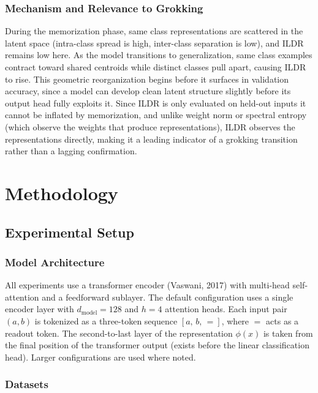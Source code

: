 \documentclass{article}
\begin{document}
\subsubsection{Mechanism and Relevance to Grokking}

During the memorization phase, same class representations are scattered in the 
latent space (intra-class spread is high, inter-class separation is low), and ILDR remains low here. As the model transitions to generalization, 
same class examples contract toward shared centroids while distinct classes pull apart, causing ILDR to rise. This geometric reorganization begins before it surfaces in validation accuracy, since a model can develop clean latent structure slightly before its output head fully exploits it. Since ILDR is only evaluated on held-out inputs it cannot be inflated by memorization, and unlike weight norm or spectral entropy (which observe the weights that produce representations), ILDR observes the representations directly, making it a leading indicator of a grokking transition rather than a lagging confirmation. 

\section{Methodology}

\subsection{Experimental Setup}

\subsubsection{Model Architecture}
All experiments use a transformer encoder (Vaswani, 2017) with multi-head self-attention and a feedforward sublayer.
The default configuration uses a single encoder layer with
$d_{\mathrm{model}} = 128$ and $h = 4$ attention heads.
Each input pair $(a, b)$ is tokenized as a three-token sequence
$[a,\, b,\, {=}]$, where $=$ acts as a readout token. The second-to-last layer of the representation $\phi(x)$ is taken from the final
position of the transformer output (exists before the linear classification head). Larger configurations are used where noted.


\subsubsection{Datasets}
\end{document}
